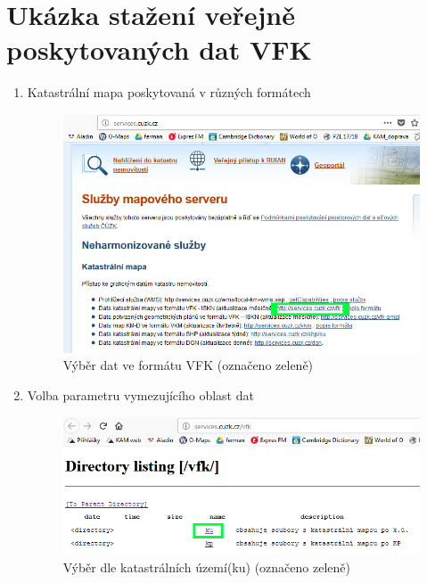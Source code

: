  \section{Ukázka stažení veřejně poskytovaných dat VFK}
 \label{sec:stazeni_dat_ukazka}
  \begin{enumerate}\bfseries
  \item{Katastrální mapa poskytovaná v různých formátech}
  \begin{figure}[H]
	 \centering
      \includegraphics[width=15cm]{./pictures/stazeni_dat_1kr.png}
      \caption{Výběr dat ve formátu VFK (označeno zeleně)}
      \label{fig:1kr_stazeni}
  \end{figure}
  
  \item{Volba parametru vymezujícího oblast dat}
  \begin{figure}[H]
	 \centering
      \includegraphics[width=15cm]{./pictures/stazeni_dat_2kr.png}
      \caption{Výběr dle katastrálních území(ku) (označeno zeleně)}
      \label{fig:2kr_stazeni}
  \end{figure}
  

\end{enumerate}
